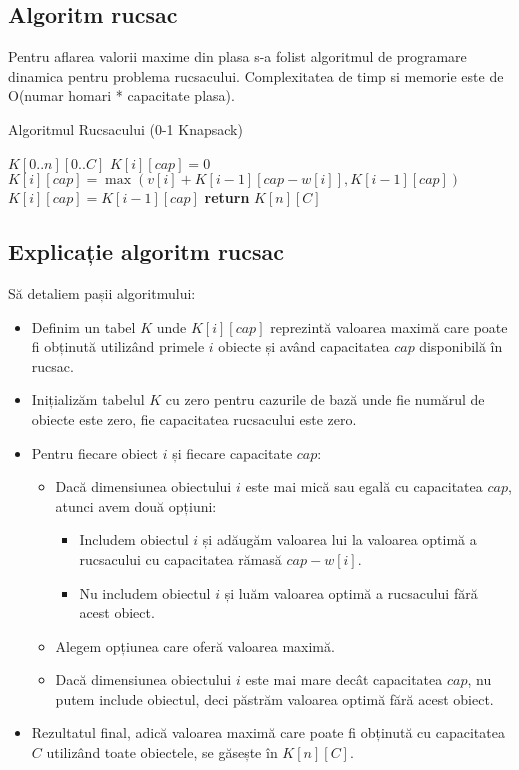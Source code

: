 \documentclass[a4paper,12pt]{article}
\begin{document}
\subsection{Algoritm rucsac}
Pentru aflarea valorii maxime din plasa s-a folist algoritmul de programare dinamica pentru problema rucsacului. Complexitatea de timp si memorie este de O(numar homari * capacitate plasa).
\begin{algorithm}
\caption{Algoritmul Rucsacului (0-1 Knapsack)}
\begin{algorithmic}[1]

\STATE {} \( K[0..n][0..C] \)
            \STATE \( K[i][cap] = 0 \)
            \STATE \( K[i][cap] = \max(v[i] + K[i-1][cap-w[i]], K[i-1][cap]) \)
        \ELSE
            \STATE \( K[i][cap] = K[i-1][cap] \)
        \ENDIF
    \ENDFOR
\ENDFOR
\STATE \textbf{return} \( K[n][C] \)
\end{algorithmic}
\end{algorithm}

\subsection{Explicație algoritm rucsac}

Să detaliem pașii algoritmului:

\begin{itemize}
    \item Definim un tabel \( K \) unde \( K[i][cap] \) reprezintă valoarea maximă care poate fi obținută utilizând primele \( i \) obiecte și având capacitatea \( cap \) disponibilă în rucsac.
    \item Inițializăm tabelul \( K \) cu zero pentru cazurile de bază unde fie numărul de obiecte este zero, fie capacitatea rucsacului este zero.
    \item Pentru fiecare obiect \( i \) și fiecare capacitate \( cap \):
    \begin{itemize}
        \item Dacă dimensiunea obiectului \( i \) este mai mică sau egală cu capacitatea \( cap \), atunci avem două opțiuni:
        \begin{itemize}
            \item Includem obiectul \( i \) și adăugăm valoarea lui la valoarea optimă a rucsacului cu capacitatea rămasă \( cap - w[i] \).
            \item Nu includem obiectul \( i \) și luăm valoarea optimă a rucsacului fără acest obiect.
        \end{itemize}
        \item Alegem opțiunea care oferă valoarea maximă.
        \item Dacă dimensiunea obiectului \( i \) este mai mare decât capacitatea \( cap \), nu putem include obiectul, deci păstrăm valoarea optimă fără acest obiect.
    \end{itemize}
    \item Rezultatul final, adică valoarea maximă care poate fi obținută cu capacitatea \( C \) utilizând toate obiectele, se găsește în \( K[n][C] \).
\end{itemize}
\end{document}
